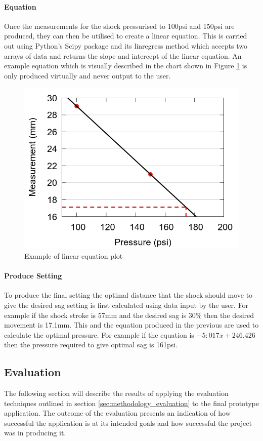 		\paragraph{Equation}
			Once the measurements for the shock pressurised to 100psi and 150psi are produced, they can then be utilised to create a linear equation. This is carried out using Python’s Scipy package and its linregress method which accepts two arrays of data and returns the slope and intercept of the linear equation. An example equation which is visually described in the chart shown in Figure \ref{fig:equation_plot} is only produced virtually and never output to the user.
			\begin{figure}[h!]
				\centering
				\includegraphics[scale=0.4]{../images/results/scatter_dotted.png}
				\caption{Example of linear equation plot}
				\label{fig:equation_plot}
			\end{figure}
		\paragraph{Produce Setting}
			To produce the final setting the optimal distance that the shock should move to give the desired sag setting is first calculated using data input by the user. For example if the shock stroke is 57mm and the desired sag is 30\% then the desired movement is 17.1mm. This and  the equation produced in the  previous are used to calculate the optimal pressure.   For example if the equation is $-5:017x+246.426$ then the pressure required to give optimal sag is 161psi.
\clearpage
	\subsection{Evaluation}
		The following section will describe the results of applying the evaluation techniques outlined in section \ref{sec:methodology_evaluation} to the final prototype application. The outcome of the evaluation presents an indication of how successful the application is at its intended goals and how successful the project was in producing it.

